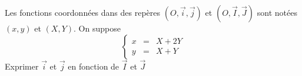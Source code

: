 Les fonctions coordonn{\'e}es dans des rep{\`e}res $(O,\overrightarrow{i}, \overrightarrow{j})$ et $(O,\overrightarrow{I}, \overrightarrow{J})$ sont not{\'e}es $(x,y)$ et $(X,Y)$. On suppose\[\left\lbrace \begin{array}{ccc}
x & = & X+2Y \\ y & = & X+Y \end{array} \right.\] Exprimer $\overrightarrow{i}$ et $\overrightarrow{j}$ en fonction de $\overrightarrow{I}$ et $\overrightarrow{J}$ \bigskip \bigskip \bigskip